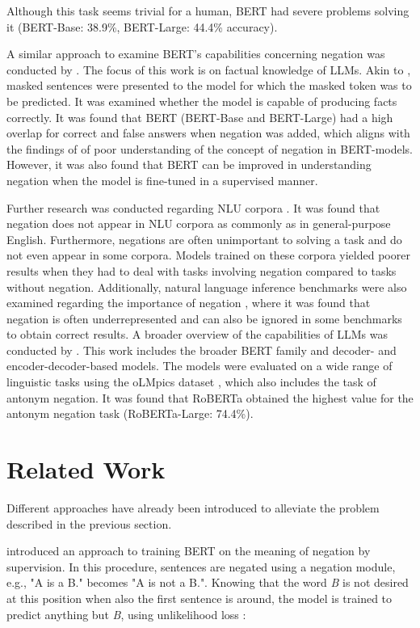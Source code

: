 \documentclass{article}
\begin{document}
Although this task seems trivial for a human, BERT had severe problems solving it (BERT-Base: 38.9\%, BERT-Large: 44.4\% accuracy).

A similar approach to examine BERT's capabilities concerning negation was conducted by \cite{kassner-schutze-2020-negated}. The focus of this work is on factual knowledge of LLMs. Akin to \cite{ettinger-2020-bert}, masked sentences were presented to the model for which the masked token was to be predicted. It was examined whether the model is capable of producing facts correctly. It was found that BERT (BERT-Base and BERT-Large) had a high overlap for correct and false answers when negation was added, which aligns with the findings of \cite{ettinger-2020-bert} of poor understanding of the concept of negation in BERT-models. However, it was also found that BERT can be improved in understanding negation when the model is fine-tuned in a supervised manner.

Further research was conducted regarding NLU corpora \citep{hossain-etal-2022-analysis}. It was found that negation does not appear in NLU corpora as commonly as in general-purpose English. Furthermore, negations are often unimportant to solving a task and do not even appear in some corpora. Models trained on these corpora yielded poorer results when they had to deal with tasks involving negation compared to tasks without negation.
Additionally, natural language inference benchmarks were also examined regarding the importance of negation \citep{hossain-etal-2020-analysis}, where it was found that negation is often underrepresented and can also be ignored in some benchmarks to obtain correct results.
A broader overview of the capabilities of LLMs was conducted by  \cite{lialin-etal-2022-life}. This work includes the broader BERT family and decoder- and encoder-decoder-based models. The models were evaluated on a wide range of linguistic tasks using the oLMpics dataset \citep{talmor-etal-2020-olmpics}, which also includes the task of antonym negation. It was found that RoBERTa obtained the highest value for the antonym negation task (RoBERTa-Large: 74.4\%).

\section{Related Work}
\label{section::rel_work}

Different approaches have already been introduced to alleviate the problem described in the previous section.

\cite{hosseini-etal-2021-understanding} introduced an approach to training BERT on the meaning of negation by supervision. In this procedure, sentences are negated using a negation module, e.g., "A is a B." becomes "A is not a B.". Knowing that the word \textit{B} is not desired at this position when also the first sentence is around, the model is trained to predict anything but \textit{B}, using unlikelihood loss \citep{welleck2019neural}:
\end{document}
